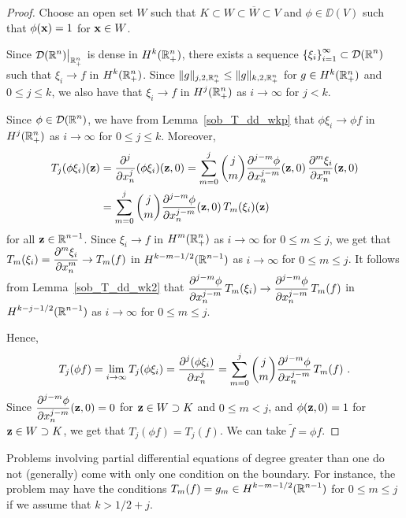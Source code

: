 \begin{proof}
Choose an open set $W$ such that $K \subset W \subset \overline{W} \subset V$
and $\phi \in \DD(V)$ such that $\phi(\VEC{x}) = 1$ for $\VEC{x} \in W$.

Since $\displaystyle \DD(\RR^n)\big|_{\RR^n_+}$ is dense in
$\displaystyle H^k(\RR^n_+)$, there exists a sequence
$\displaystyle \left\{\xi_i\right\}_{i=1}^\infty \subset \DD(\RR^n)$
such that $\xi_i \to f$ in $\displaystyle H^k(\RR^n_+)$.
Since $\|g\|_{j,2,\RR^n_+} \leq \|g\|_{k,2,\RR^n_+}$ for $g \in H^k(\RR^n_+)$
and $0 \leq j \leq k$, we also have that $\xi_i \to f$ in
$\displaystyle H^j(\RR^n_+)$ as $i \to \infty$ for $j<k$.

Since $\displaystyle \phi \in \DD(\RR^n)$, we have from
Lemma~\ref{sob_T_dd_wkp} that 
$\phi \xi_i \to \phi f$ in $\displaystyle H^j(\RR^n_+)$ as $i \to \infty$
for $0 \leq j \leq k$.  Moreover,
\begin{align*}
T_j( \phi \xi_i)(\VEC{z}) &= \pdfdxn{(\phi \xi_i)}{x_n}{j}(\VEC{z},0)
= \sum_{m=0}^j \binom{j}{m} \pdydxn{\phi}{x_n}{j-m}(\VEC{z},0)\,
\pdydxn{\xi_i}{x_n}{m}(\VEC{z},0) \\
&= \sum_{m=0}^j \binom{j}{m} \pdydxn{\phi}{x_n}{j-m}(\VEC{z},0)\,
T_m(\xi_i)(\VEC{z})
\end{align*}
for all $\displaystyle \VEC{z} \in \RR^{n-1}$.
Since $\xi_i \to f$ in $\displaystyle H^m(\RR^n_+)$ as $i \to \infty$ for
$0 \leq m \leq j$, we get that
$\displaystyle T_m(\xi_i) = \pdydxn{\xi_i}{x_n}{m} \to T_m(f)$
in $\displaystyle H^{k-m-1/2}(\RR^{n-1})$
as $i \to \infty$ for $0 \leq m \leq j$.  It follows from
Lemma~\ref{sob_T_dd_wk2} that
$\displaystyle \pdydxn{\phi}{x_n}{j-m}\, T_m(\xi_i) 
\to \pdydxn{\phi}{x_n}{j-m}\, T_m(f)$ in
$\displaystyle H^{k-j-1/2}(\RR^{n-1})$ as $i \to \infty$ for
$0 \leq m \leq j$.

Hence,
\[
T_j(\phi f) = \lim_{i\to \infty} T_j( \phi \xi_i) = \pdydxn{(\phi \xi_i)}{x_n}{j}
= \sum_{m=0}^j \binom{j}{m} \pdydxn{\phi}{x_n}{j-m}\, T_m(f) \ .
\]
Since $\displaystyle \pdydxn{\phi}{x_n}{j-m}(\VEC{z},0) = 0$
for $\VEC{z} \in W \supset K$ and $0 \leq m<j$, and
$\displaystyle \phi(\VEC{z},0) = 1$ for $\VEC{z} \in W \supset K$, we
get that $\displaystyle T_j(\phi f) = T_j(f)$.  We can take
$\tilde{f} = \phi f$.
\end{proof}

Problems involving partial differential equations of degree greater
than one do not (generally) come with only one condition on the
boundary.  For instance, the problem may have the conditions
$\displaystyle T_m(f) = g_m \in H^{k-m-1/2}(\RR^{n-1})$ for
$0 \leq m \leq j$ if we assume that $k > 1/2 +j$.

